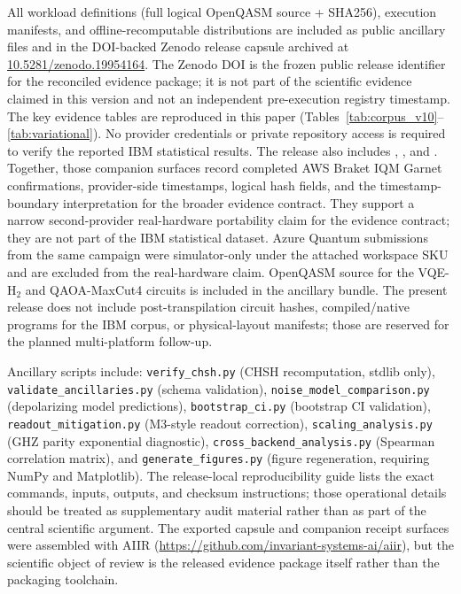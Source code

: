 \documentclass[aps,prxquantum,twocolumn,superscriptaddress,amsmath,amssymb,longbibliography,floatfix]{revtex4-2}
\begin{document}
All workload definitions (full logical OpenQASM source + SHA256), execution manifests, and offline-recomputable distributions are included as public ancillary files and in the DOI-backed Zenodo release capsule archived at \href{https://doi.org/10.5281/zenodo.19954164}{10.5281/zenodo.19954164}. The Zenodo DOI is the frozen public release identifier for the reconciled evidence package; it is not part of the scientific evidence claimed in this version and not an independent pre-execution registry timestamp. The key evidence tables are reproduced in this paper (Tables~\ref{tab:corpus_v10}--\ref{tab:variational}). No provider credentials or private repository access is required to verify the reported IBM statistical results. The release also includes , , and . Together, those companion surfaces record completed AWS Braket IQM Garnet confirmations, provider-side timestamps, logical hash fields, and the timestamp-boundary interpretation for the broader evidence contract. They support a narrow second-provider real-hardware portability claim for the evidence contract; they are not part of the IBM statistical dataset. Azure Quantum submissions from the same campaign were simulator-only under the attached workspace SKU and are excluded from the real-hardware claim. OpenQASM source for the VQE-H$_2$ and QAOA-MaxCut4 circuits is included in the ancillary bundle. The present release does not include post-transpilation circuit hashes, compiled/native programs for the IBM corpus, or physical-layout manifests; those are reserved for the planned multi-platform follow-up.

Ancillary scripts include: \texttt{verify\_chsh.py} (CHSH recomputation, stdlib only), \texttt{validate\_ancillaries.py} (schema validation), \texttt{noise\_model\_comparison.py} (depolarizing model predictions), \texttt{bootstrap\_ci.py} (bootstrap CI validation), \texttt{readout\_mitigation.py} (M3-style readout correction), \texttt{scaling\_analysis.py} (GHZ parity exponential diagnostic), \texttt{cross\_backend\_analysis.py} (Spearman correlation matrix), and \texttt{generate\_figures.py} (figure regeneration, requiring NumPy and Matplotlib). The release-local reproducibility guide lists the exact commands, inputs, outputs, and checksum instructions; those operational details should be treated as supplementary audit material rather than as part of the central scientific argument. The exported capsule and companion receipt surfaces were assembled with AIIR (\url{https://github.com/invariant-systems-ai/aiir}), but the scientific object of review is the released evidence package itself rather than the packaging toolchain.


\end{document}
